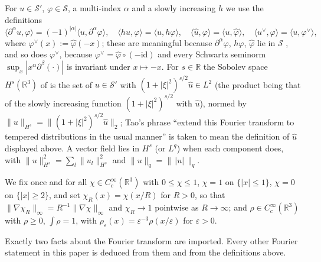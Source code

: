 \documentclass[11pt]{article}
\theoremstyle{definition}
\theoremstyle{plain}
\newcommand{\R}{\mathbb R}
\begin{document}
For $u\in\mathcal S'$, $\varphi\in\mathcal S$, a multi-index $\alpha$ and a
slowly increasing $h$ we use the definitions
\cite[Definitions~2.3.6, 2.3.7, 2.3.15, pp.~123 and~125]{Grafakos2014}
\[
 \langle\partial^\alpha u,\varphi\rangle=(-1)^{|\alpha|}\langle u,\partial^\alpha\varphi\rangle,\quad
 \langle hu,\varphi\rangle=\langle u,h\varphi\rangle,\quad
 \langle\hat u,\varphi\rangle=\langle u,\hat\varphi\rangle,\quad
 \langle u^\vee,\varphi\rangle=\langle u,\varphi^\vee\rangle,
\]
where $\varphi^\vee(x):=\hat\varphi(-x)$; these are meaningful because
$\partial^\alpha\varphi$, $h\varphi$, $\hat\varphi$ lie in
$\mathcal S$ \cite[Remark~2.2.3, p.~105; Proposition~2.2.11(11), p.~110;
p.~125]{Grafakos2014}, and so does $\varphi^\vee$, because
$\varphi^\vee=\hat\varphi\circ(-\mathrm{id})$ and every Schwartz seminorm
$\sup_x|x^\alpha\partial^\beta(\cdot)|$ is invariant under $x\mapsto-x$.  For $s\in\R$ the Sobolev space $H^s(\R^3)$ of
\cite[p.~36]{Tao2013} is the set of $u\in\mathcal S'$ with
$(1+|\xi|^2)^{s/2}\hat u\in L^2$ (the product being that of the slowly
increasing function $(1+|\xi|^2)^{s/2}$ with $\hat u$), normed by
$\|u\|_{H^s}=\|(1+|\xi|^2)^{s/2}\hat u\|_2$; Tao's phrase ``extend this
Fourier transform to tempered distributions in the usual manner''
\cite[p.~35]{Tao2013} is taken to mean the definition of $\hat u$ displayed
above.  A vector field lies in $H^s$ (or $L^q$) when each component does,
with $\|u\|_{H^s}^2=\sum_l\|u_l\|_{H^s}^2$ and $\|u\|_q=\|\,|u|\,\|_q$.

We fix once and for all $\chi\in C_c^\infty(\R^3)$ with $0\le\chi\le1$,
$\chi=1$ on $\{|x|\le1\}$, $\chi=0$ on $\{|x|\ge2\}$, and set
$\chi_R(x)=\chi(x/R)$ for $R>0$, so that
$\|\nabla\chi_R\|_\infty=R^{-1}\|\nabla\chi\|_\infty$ and $\chi_R\to1$
pointwise as $R\to\infty$; and $\rho\in C_c^\infty(\R^3)$ with $\rho\ge0$,
$\int\rho=1$, with $\rho_\varepsilon(x)=\varepsilon^{-3}\rho(x/\varepsilon)$
for $\varepsilon>0$.

Exactly two facts about the Fourier transform are imported.  Every other
Fourier statement in this paper is deduced from them and from the
definitions above.
\end{document}

